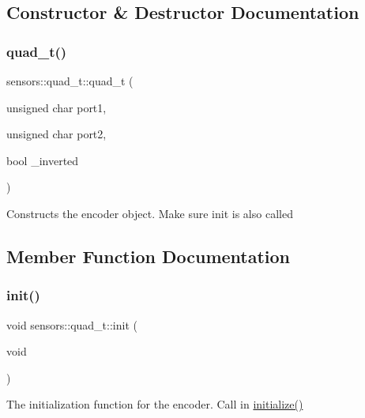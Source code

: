\subsection{Constructor \& Destructor Documentation}
\mbox{\label{structsensors_1_1quad__t_a5d32ea19d30a4b33e6d99f94df08b9e7}} 
\subsubsection{\texorpdfstring{quad\+\_\+t()}{quad\_t()}}
{\footnotesize\ttfamily sensors\+::quad\+\_\+t\+::quad\+\_\+t (\begin{DoxyParamCaption}\item[{unsigned char}]{port1,  }\item[{unsigned char}]{port2,  }\item[{bool}]{\+\_\+inverted }\end{DoxyParamCaption})}

Constructs the encoder object. Make sure init is also called 

\subsection{Member Function Documentation}
\mbox{\label{structsensors_1_1quad__t_a27e6a2d1744cea7570b81fb03086cfa4}} 
\subsubsection{\texorpdfstring{init()}{init()}}
{\footnotesize\ttfamily void sensors\+::quad\+\_\+t\+::init (\begin{DoxyParamCaption}\item[{void}]{ }\end{DoxyParamCaption})}

The initialization function for the encoder. Call in \hyperlink{main_8h_a25a40b6614565f755233080a384c35f1}{initialize()} \mbox{\label{structsensors_1_1quad__t_ab68ad73b35c435a8b3419403c0e95b74}} 
